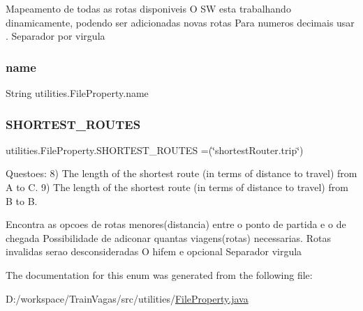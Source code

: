 Mapeamento de todas as rotas disponiveis O SW esta trabalhando dinamicamente, podendo ser adicionadas novas rotas Para numeros decimais usar \textquotesingle{}.\textquotesingle{} Separador por virgula \mbox{\label{enumutilities_1_1_file_property_a85714af226bffac084d6264b5bac15d7}} 
\subsubsection{\texorpdfstring{name}{name}}
{\footnotesize\ttfamily String utilities.\+File\+Property.\+name\hspace{0.3cm}{\ttfamily [private]}}

\mbox{\label{enumutilities_1_1_file_property_ae43a0f6ce3fd6c1cb9ec0e8d42ba2cf0}} 
\subsubsection{\texorpdfstring{S\+H\+O\+R\+T\+E\+S\+T\+\_\+\+R\+O\+U\+T\+ES}{SHORTEST\_ROUTES}}
{\footnotesize\ttfamily utilities.\+File\+Property.\+S\+H\+O\+R\+T\+E\+S\+T\+\_\+\+R\+O\+U\+T\+ES =(\char`\"{}shortest\+Router.\+trip\char`\"{})}

Questoes\+: 8) The length of the shortest route (in terms of distance to travel) from A to C. 9) The length of the shortest route (in terms of distance to travel) from B to B.

Encontra as opcoes de rotas menores(distancia) entre o ponto de partida e o de chegada Possibilidade de adiconar quantas viagens(rotas) necessarias. Rotas invalidas serao desconsideradas O hifem e opcional Separador virgula 

The documentation for this enum was generated from the following file\+:\begin{DoxyCompactItemize}
\item 
D\+:/workspace/\+Train\+Vagas/src/utilities/\hyperlink{_file_property_8java}{File\+Property.\+java}\end{DoxyCompactItemize}
